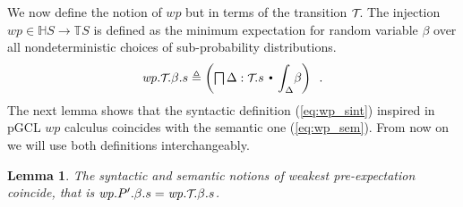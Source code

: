 \documentclass{eptcs}
\theoremstyle{plain}
\newtheorem{lemma}[theorem]{Lemma}
\theoremstyle{definition}
\newcommand{\lit}[1]{\ensuremath{\mathit{#1}}}
\newcommand{\Prg}{P}
\newcommand{\Tau}{\mbox{\small\ensuremath{\mathcal{T}}}\!}
\newcommand{\totype}{\ensuremath{\ra}}
\newcommand{\HS}{\lit{\mathbb{H}S}}
\newcommand{\TS}{\lit{\mathbb{T}S}}
\newcommand{\Def}{\ensuremath{\triangleq}}
\newcommand{\ra}{\ensuremath{\rightarrow}}
\newcommand{\dotsep}{\mbox{\raisebox{0.4ex}{\tiny\ensuremath{\:\;\bullet\;\:}}}}
\newcommand{\Wp}{\lit{wp}}
\begin{document}
We now define the notion of $\Wp$ but in terms of the transition $\Tau$. 
The injection $\Wp \in \HS \totype \TS$ is defined as the minimum expectation for random variable $\beta$ over all nondeterministic choices of sub-probability distributions.
\begin{equation}
\label{eq:wp_sem}\textstyle
	\Wp{}.\Tau.\beta.s \Def \left(\bigsqcap \Delta : \Tau.s \dotsep {\textstyle{\displaystyle\int}_{\!\!\!\Delta}} \beta\right)\enspace.
\end{equation}
The next lemma shows that the syntactic definition (\ref{eq:wp_sint}) inspired in pGCL $\Wp$ calculus coincides with the semantic one (\ref{eq:wp_sem}).
From now on we will use both definitions interchangeably.
\begin{lemma}
	The syntactic and semantic notions of weakest pre-expectation coincide, that is
	$\Wp{}.\Prg'.\beta.s = \Wp{}.\Tau.\beta.s$\enspace.
\end{lemma}
\end{document}
